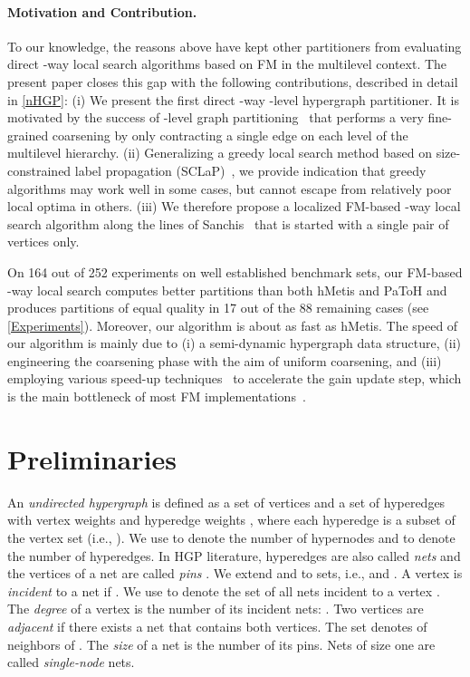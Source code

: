 \documentclass[runningheads,a4paper]{llncs}
\begin{document}
\paragraph{Motivation and Contribution.}
To our knowledge, the reasons above have kept other partitioners from evaluating direct -way local search
algorithms based on FM in the multilevel context. The present paper closes this gap with the following 
contributions, described in detail in \autoref{nHGP}:
(i) We present the first direct -way -level hypergraph partitioner. It is motivated by the success of -level graph 
partitioning~\cite{nGP} that performs a very fine-grained coarsening by only contracting a single edge on each level of the multilevel hierarchy. 
(ii) Generalizing a greedy local search method based on size-constrained label propagation (SCLaP)~\cite{LPAgraphPartitioning}, we provide indication that greedy algorithms may work well in some cases, but cannot escape from relatively poor local optima in others.
(iii) We therefore propose a localized FM-based -way local search algorithm along the lines of Sanchis~\cite{HypergraphKFM}
that is started with a single pair of vertices only.

On 164 out of 252 experiments on  well established benchmark sets, our FM-based -way local search computes better partitions than both hMetis and PaToH and produces
 partitions of equal quality in 17 out of the 88 remaining cases (see \autoref{Experiments}).
Moreover, our algorithm is about as fast as hMetis. The  speed of our algorithm is mainly due to (i)
a semi-dynamic hypergraph data structure, (ii) engineering the coarsening phase with the aim of
uniform coarsening, and (iii)
employing various speed-up techniques~\cite{Caldwell,FM82,LockedNets} to accelerate
the gain update step, which is the main bottleneck of most FM implementations~\cite{Papa2007}. 

\vfill
\section{Preliminaries} \label{Preliminaries}
An \textit{undirected hypergraph}  is defined as a set of vertices  and a
set of hyperedges  with vertex weights  and hyperedge 
weights , where each hyperedge is a subset of the vertex set  (i.e., ).
We use  to denote the number of hypernodes and  to denote the number of hyperedges. In
HGP literature, hyperedges are also called \emph{nets} and the vertices of a net are called \emph{pins} \cite{PaToH}.
We extend  and  to sets, i.e.,  and .
A vertex  is \textit{incident} to a net  if . We use  to denote the set of all nets incident to a vertex . 
The \textit{degree}  of a vertex  is the number of its incident nets: .
Two vertices are \textit{adjacent} if there exists a net  that contains both vertices. The set  denotes of neighbors of .
The \textit{size}  of a net  is the number of its pins. Nets of size one are called \emph{single-node} nets.
\end{document}
